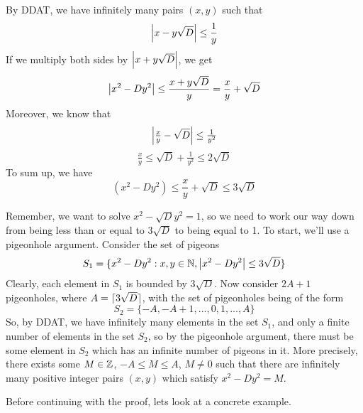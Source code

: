 \documentclass[../main.tex]{subfiles}
\begin{document}
By DDAT, we have infinitely many pairs $(x,y)$ such that $$\abs{x-y\sqrt{D}} \leq \dfrac{1}{y}$$ If we multiply both sides by $\abs{x+y\sqrt{D}}$, we get $$\abs{x^2-Dy^2} \leq \dfrac{x+y\sqrt{D}}{y} = \dfrac{x}{y} + \sqrt{D}$$ Moreover, we know that $$\abs{\tfrac{x}{y}-\sqrt{D}} \leq \tfrac{1}{y^2}$$ $$\tfrac{x}{y} \leq \sqrt{D}+\tfrac{1}{y^2} \leq 2\sqrt{D}$$ To sum up, we have $$(x^2-Dy^2) \leq \dfrac{x}{y}+\sqrt{D} \leq 3\sqrt{D}$$

Remember, we want to solve $x^2-\sqrt{D}y^2=1$, so we need to work our way down from being less than or equal to $3\sqrt{D}$ to being equal to 1. To start, we'll use a pigeonhole argument. Consider the set of pigeons $$S_1=\{x^2-Dy^2:x,y \in \mathbb{N}, \abs{x^2-Dy^2} \leq 3\sqrt{D}\}$$ Clearly, each element in $S_1$ is bounded by $3\sqrt{D}$. Now consider $2A+1$ pigeonholes, where $A=\lceil3\sqrt{D}\rceil$, with the set of pigeonholes being of the form $$S_2=\{-A,-A+1,...,0,1,...,A\}$$ So, by DDAT, we have infinitely many elements in the set $S_1$, and only a finite number of elements in the set $S_2$, so by the pigeonhole argument, there must be some element in $S_2$ which has an infinite number of pigeons in it. More precisely, there exists some $M \in \mathbb{Z}$, $-A \leq M \leq A$, $M \neq 0$ such that there are infinitely many positive integer pairs $(x,y)$ which satisfy $x^2-Dy^2=M$. \sspace

Before continuing with the proof, lets look at a concrete example.
\end{document}
